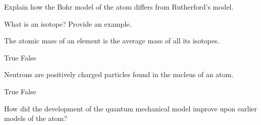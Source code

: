 \documentclass{exam}
\begin{document}
\begin{questions}
\makeemptybox{1in}

\question[5] Explain how the Bohr model of the atom differs from Rutherford's model.  

\makeemptybox{1in}

\question[5] What is an isotope? Provide an example.  

\makeemptybox{1in}

\question[2] The atomic mass of an element is the average mass of all its isotopes.  
\begin{checkboxes}
    \choice True
    \choice False
\end{checkboxes}


\question[2] Neutrons are positively charged particles found in the nucleus of an atom.  
\begin{checkboxes}
    \choice True
    \choice False
\end{checkboxes}

\vspace{1cm}

\question[5] How did the development of the quantum mechanical model improve upon earlier models of the atom?  





\end{questions}
\end{document}
